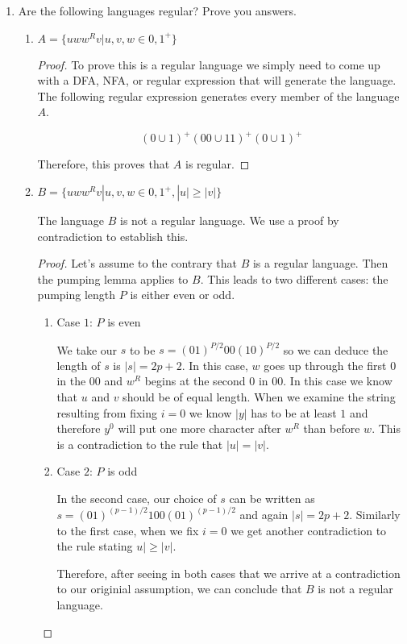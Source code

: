 \documentclass[11pt]{article}
\begin{document}
\begin{enumerate}
\item
Are the following languages regular? Prove you answers. 
\begin{enumerate}

\item
$A = \{ uww^Rv | u,v,w \in {0, 1}^+ \}$

\begin{proof}
To prove this is a regular language we simply need to come up with a DFA, NFA, or regular expression that will generate the language.  The following regular expression generates every member of the language $A$.  

$$ (0 \cup 1)^+(00 \cup 11)^+(0 \cup 1)^+ $$

Therefore, this proves that $A$ is regular.  
\end{proof}

\item
$B = \{ uww^Rv | u,v,w \in {0, 1}^+, |u| \geq |v| \}$

The language $B$ is not a regular language.  We use a proof by contradiction to establish this.  

\begin{proof}

Let's assume to the contrary that $B$ is a regular language.  Then the pumping lemma applies to $B$.  This leads to two different cases: the pumping length $P$ is either even or odd.  

\begin{enumerate}

\item Case $1$: $P$ is even

We take our $s$ to be $s = (01)^{P/2}00(10)^{P/2}$ so we can deduce the length of $s$ is $|s| = 2p+2$.  In this case, $w$ goes up through the first $0$ in the $00$ and $w^R$ begins at the second $0$ in $00$.  In this case we know that $u$ and $v$ should be of equal length.  When we examine the string resulting from fixing $i=0$ we know $|y|$ has to be at least $1$ and therefore $y^0$ will put one more character after $w^R$ than before $w$.  This is a contradiction to the rule that $|u| = |v|$.  

\item Case $2$: $P$ is odd

In the second case, our choice of $s$ can be written as $s = (01)^{(p-1)/2}100(01)^{(p-1)/2}$ and again $|s| = 2p+2$.  Similarly to the first case, when we fix $i=0$ we get another contradiction to the rule stating $u| \geq |v|$.  

Therefore, after seeing in both cases that we arrive at a contradiction to our originial assumption, we can conclude that $B$ is not a regular language.  


\end{enumerate}
\end{proof}
\end{enumerate}
\end{enumerate}
\end{document}
